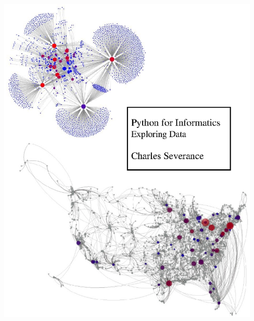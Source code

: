 \documentclass[10pt]{book}
\begin{document}
\frontmatter




\newtheorem{ex}{Exercise}[chapter]

\begin{latexonly}

\renewcommand{\blankpage}{\thispagestyle{empty} \quad \newpage}



\thispagestyle{empty}

\centerline{\includegraphics[height=7.00in]{cover/cover.eps}}



\end{latexonly}
\end{document}
